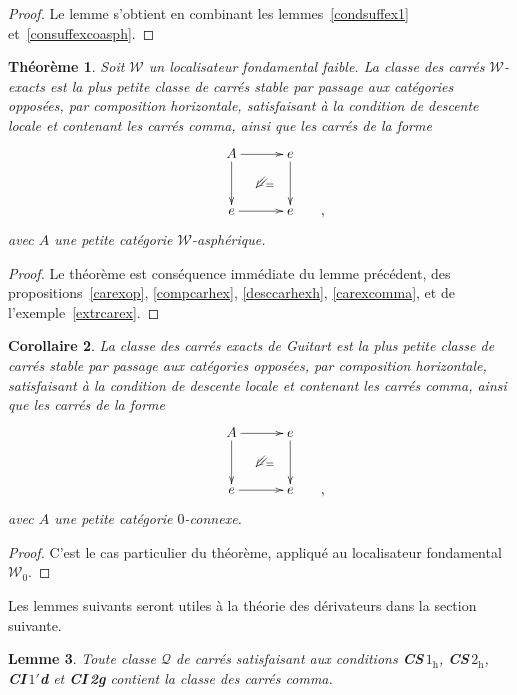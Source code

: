\documentclass[francais]{smfart}
\theoremstyle{plain}
\newtheorem{thm}{Th\'eor\`eme}[section]
\newtheorem{lemme}[thm]{Lemme}
\newtheorem{cor}[thm]{Corollaire}
\theoremstyle{remark}
\theoremstyle{definition}
\numberwithin{equation}{thm}
\begin{document}
\begin{proof}
Le lemme s'obtient en combinant les lemmes~\ref{condsuffex1} et~\ref{consuffexcoasph}.
\end{proof}

\begin{thm} \label{carclassex2}
Soit ${\mathcal{W}}$ un localisateur fondamental faible. La classe des carrés ${\mathcal{W}}$-exacts est la plus petite classe de carrés stable par passage aux catégories opposées, par composition horizontale, satisfaisant à la condition de descente locale et contenant les carrés comma, ainsi que les carrés de la forme
\[
\UseTwocells
\xymatrixcolsep{2.5pc}
\xymatrixrowsep{2.4pc}
\xymatrix{
&A\ar[d]_{}\ar[r]^{}
\drtwocell<\omit>{}
&e\ar[d]\ar@<-2ex>@{}[d]_(.55){=}
\\
&e\ar[r]_{}
&e
&\hskip -30pt,
}
\]
avec $A$ une petite catégorie ${\mathcal{W}}$-asphérique.
\end{thm}

\begin{proof} 
Le théorème est conséquence immédiate du lemme précédent, des propositions~\ref{carexop}, \ref{compcarhex}, \ref{desccarhexh}, \ref{carexcomma}, et de l'exemple~\ref{extrcarex}.
\end{proof}

\begin{cor} \label{carclassexGuit}
La classe des carrés exacts de Guitart est la plus petite classe de carrés stable par passage aux catégories opposées, par composition horizontale, satisfaisant à la condition de descente locale et contenant les carrés comma, ainsi que les carrés de la forme
\[
\UseTwocells
\xymatrixcolsep{2.5pc}
\xymatrixrowsep{2.4pc}
\xymatrix{
&A\ar[d]_{}\ar[r]^{}
\drtwocell<\omit>{}
&e\ar[d]\ar@<-2ex>@{}[d]_(.55){=}
\\
&e\ar[r]_{}
&e
&\hskip -30pt,
}
\]
avec $A$ une petite catégorie $0$-connexe.
\end{cor}

\begin{proof}
C'est le cas particulier du théorème, appliqué au localisateur fondamental ${{\mathcal{W}}_{0}}$.
\end{proof}

\noindent
Les lemmes suivants seront utiles à la théorie des dérivateurs dans la section suivante.

\begin{lemme} \label{condsuffexcomma}
Toute classe ${\mathcal{Q}}$ de carrés satisfaisant aux conditions \emph{\textbf{\boldmath CS\,$1_{\mathrm h}$}, \textbf{\boldmath CS\,$2_{\mathrm h}$}, \textbf{\boldmath CI\,$1'$d}} et \emph{\textbf{CI\,2g}} contient la classe des carrés comma.
\end{lemme}
\end{document}
